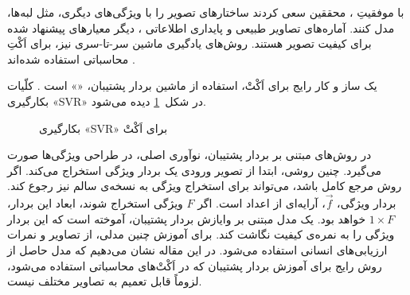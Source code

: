 \documentclass[twocolumn]{article}
\begin{document}
با موفقیتِ ، محققین سعی کردند ساختارهای تصویر را با ویژگی‌های دیگری، مثل لبه‌ها، مدل کنند. آماره‌های تصاویر طبیعی \cite{ruderman1994statistics} و پایداری اطلاعاتی \cite{sheikh2006image}، دیگر معیارهای پیشنهاد شده برای کیفیت تصویر هستند. روش‌های یادگیری ماشین سر-تا-سری نیز، برای اَکْتِ محاسباتی استفاده شده‌اند \cite{kim2017deep, yang2019survey, ye2012unsupervised}.

یک ساز و کار رایج برای اَکْتْ، استفاده از ماشین بردار پشتیبان، «» \cite{vapnik1999nature} است \cite{cheraaqee}. کلّیات بکارگیری «SVR» در شکل~\ref{fig:svr} دیده می‌شود.
\begin{figure}
	\begin{center}
	\end{center}
	\caption{بکارگیری «SVR» برای اَکْتْ}
	\label{fig:svr}
\end{figure}
در روش‌های مبتنی بر بردار پشتیبان، نوآوری اصلی، در طراحی ویژگی‌ها صورت می‌گیرد. چنین روشی، ابتدا از تصویر ورودی یک بردار ویژگی استخراج می‌کند. اگر روش مرجع کامل باشد، می‌تواند برای استخراج ویژگی به نسخه‌ی سالم نیز رجوع کند. بردار ویژگی، $\vec{f}$، آرایه‌ای از اعداد است. اگر $F$ ویژگی استخراج شوند، ابعاد این بردار، $1\times F$ خواهد بود. یک مدل مبتنی بر وایازش بردار پشتیبان، آموخته است که این بردار ویژگی را به نمره‌ی کیفیت نگاشت کند. برای آموزش چنین مدلی، از تصاویر و نمرات ارزیابی‌های انسانی استفاده می‌شود. در این مقاله نشان می‌دهیم که مدل حاصل از روش رایج برای آموزش بردار پشتیبان که در اَکْتْ‌های محاسباتی استفاده می‌شود، لزوماً قابل تعمیم به تصاویر مختلف نیست.
\end{document}
